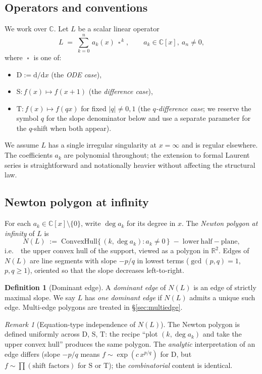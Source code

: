 \documentclass[11pt,a4paper]{article}
\theoremstyle{plain}
\theoremstyle{definition}
\newtheorem{definition}[theorem]{Definition}
\theoremstyle{remark}
\newtheorem{remark}[theorem]{Remark}
\newcommand{\op}{\mathop{\square}}                %
\newcommand{\opD}{\mathrm{D}}                     %
\newcommand{\opS}{\mathrm{S}}                     %
\newcommand{\opT}{\mathrm{T}}                     %
\newcommand{\NL}{N(L)}
\newcommand{\ie}{i.e.\ }
\begin{document}
\subsection{Operators and conventions}\label{ssec:prelim-ops}

We work over $\mathbb{C}$. Let $L$ be a scalar linear operator
\[
   L \;=\; \sum_{k=0}^{n}\, a_k(x)\, \op^{\,k},
   \qquad a_k \in \mathbb{C}[x],\ a_n \ne 0,
\]
where $\op$ is one of:
\begin{itemize}[leftmargin=2em]
\item $\opD := \mathrm{d}/\mathrm{d}x$ \quad (the \emph{ODE case}),
\item $\opS \colon f(x) \mapsto f(x+1)$ \quad (the \emph{difference case}),
\item $\opT \colon f(x) \mapsto f(qx)$ for fixed $|q| \ne 0, 1$ \quad
      (the \emph{$q$-difference case}; we reserve the symbol $q$ for the
      slope denominator below and use a separate parameter for the
      $q$-shift when both appear).
\end{itemize}
We assume $L$ has a single irregular singularity at $x = \infty$ and is
regular elsewhere. The coefficients $a_k$ are polynomial throughout; the
extension to formal Laurent series is straightforward and notationally
heavier without affecting the structural law.

\subsection{Newton polygon at infinity}\label{ssec:prelim-Newton}

For each $a_k \in \mathbb{C}[x] \setminus \{0\}$, write $\deg a_k$ for its
degree in $x$. The \emph{Newton polygon at infinity} of $L$ is
\[
   \NL \;:=\;
   \mathrm{ConvexHull}\big\{\,(k, \deg a_k) : a_k \ne 0\,\big\}
   \;-\; \mathrm{lower\ half\!-plane},
\]
\ie\ the upper convex hull of the support, viewed as a polygon in
$\mathbb{R}^2$. Edges of $\NL$ are line segments with slope $-p/q$ in
lowest terms ($\gcd(p, q) = 1$, $p, q \ge 1$), oriented so that the slope
decreases left-to-right.

\begin{definition}[Dominant edge]\label{def:dominant-edge}
A \emph{dominant edge} of $\NL$ is an edge of strictly maximal slope. We
say $L$ has \emph{one dominant edge} if $\NL$ admits a unique such edge.
Multi-edge polygons are treated in \S\ref{sec:multiedge}.
\end{definition}

\begin{remark}[Equation-type independence of $N(L)$]\label{rem:Newton-uniform}
The Newton polygon is defined uniformly across $\opD$, $\opS$, $\opT$:
the recipe ``plot $(k, \deg a_k)$ and take the upper convex hull'' produces
the same polygon. The \emph{analytic} interpretation of an edge differs
(slope $-p/q$ means $f \sim \exp(c\, x^{p/q})$ for $\opD$, but
$f \sim \prod (\text{shift factors})$ for $\opS$ or $\opT$); the
\emph{combinatorial} content is identical.
\end{remark}
\end{document}
